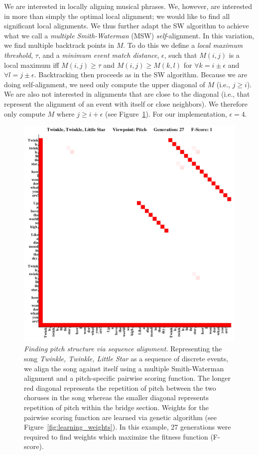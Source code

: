 \documentclass[phd,electronic,oneside,twosidetoc,letterpaper,chaptercenter,parttop,lol,lof,lot]{byumsphd}
\begin{document}
We are interested in locally aligning musical phrases. We, however, are interested in more than simply the optimal local alignment; we would like to find all significant local alignments. We thus further adapt the SW algorithm to achieve what we call a \textit{multiple Smith-Waterman} (MSW) \textit{self}-alignment. In this variation, we find multiple backtrack points in $M$. To do this we define a \textit{local maximum threshold}, $\tau$, and a \textit{minimum event match distance}, $\epsilon$, such that $M(i,j)$ is a local maximum iff $M(i,j) \geq \tau$ and $M(i,j) \geq M(k,l)$ for $\forall k = i\pm\epsilon$ and $\forall l = j\pm\epsilon$. Backtracking then proceeds as in the SW algorithm. Because we are doing self-alignment, we need only compute the upper diagonal of $M$ (i.e., $j \geq i$). We are also not interested in alignments that are close to the diagonal (i.e., that represent the alignment of an event with itself or close neighbors). We therefore only compute $M$ where $j \geq i + \epsilon$ (see Figure~\ref{fig:alignment_example}). For our implementation, $\epsilon = 4$.

\begin{figure}
\centering
	\includegraphics[width=.7\linewidth]{Twinkle__Twinkle__Little_Star_gen27_id137_pitch}

    \caption{\label{fig:alignment_example}\textit{Finding pitch structure via sequence alignment}. Representing the song \textit{Twinkle, Twinkle, Little Star} as a sequence of discrete events, we align the song against itself using a multiple Smith-Waterman alignment and a pitch-specific pairwise scoring function. The longer red diagonal represents the repetition of pitch between the two choruses in the song whereas the smaller diagonal represents repetition of pitch within the bridge section. Weights for the pairwise scoring function are learned via genetic algorithm (see Figure~\ref{fig:learning_weights}). In this example, 27 generations were required to find weights which maximize the fitness function (F-score).}
\end{figure}
\end{document}
